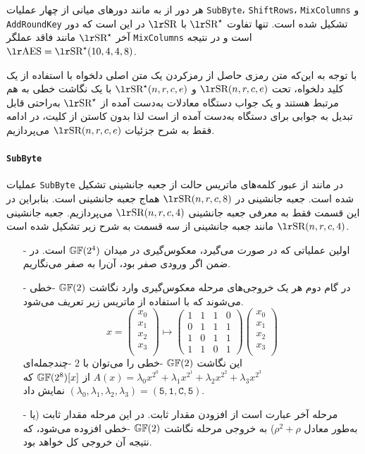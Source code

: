 هر دور از 
به مانند دورهای میانی 
از چهار عملیات 
\texttt{SubByte}، \texttt{ShiftRows}، \texttt{MixColumns}
و 
\texttt{AddRoundKey}
تشکیل شده است. تنها تفاوت 
$\text{\en{SR}}^{\star}$
با 
$\text{\en{SR}}$
در این است که دور آخر 
$\text{\en{SR}}^{\star}$
مانند 
 فاقد عملگر 
\texttt{MixColumns}
است و در نتیجه 
$\text{\en{AES}} = \text{\en{SR}}^{\star}(10,4,4,8)$.

با توجه به این‌که متن رمزی حاصل از رمزکردن یک متن اصلی دلخواه با استفاده از یک کلید دلخواه، تحت 
$\text{\en{SR}}(n,r,c,e)$
و 
$\text{\en{SR}}^{\star}(n,r,c,e)$
با یک نگاشت خطی به هم مرتبط هستند و  یک جواب  دستگاه معادلات  به‌دست آمده از 
$\text{\en{SR}}^{\star}$
به‌راحتی قابل تبدیل به جوابی برای دستگاه به‌دست آمده از 
است لذا بدون کاستن از کلیت، در ادامه فقط به شرح جزئیات 
$\text{\en{SR}}(n,r,c,e)$
می‌پردازیم. 
\paragraph*{\texttt{SubByte}} 
عملیات 
\texttt{SubByte}
در 
مانند 
از عبور کلمه‌های ماتریس حالت از جعبه جانشینی تشکیل شده است. جعبه جانشینی در 
$\text{\en{SR}}(n,r,c,8)$
هماج جعبه جانشینی 
است. بنابراین در این قسمت فقط به معرفی جعبه جانشینی 
$\text{\en{SR}}(n,r,c,4)$
می‌پردازیم. جعبه جانشینی 
$\text{\en{SR}}(n,r,c,4)$
مانند جعبه جانشینی 
از سه قسمت به شرح زیر تشکیل شده است. 
\begin{itemize}
\item[-] 
اولین عملیاتی که در 
صورت می‌گیرد، معکوس‌گیری در میدان 
$\mathbb{GF}(2^{4})$
است. در ضمن اگر ورودی صفر بود، آن‌را به صفر می‌نگاریم. 
\item[-]
در گام دوم هر یک خروجی‌های  مرحله معکوس‌گیری وارد نگاشت 
$\mathbb{GF}(2)$
-خطی می‌شوند که با استفاده از ماتریس زیر تعریف می‌شود. 
$$
x = \begin{pmatrix}
x_{0}\\
x_{1}\\
x_{2}\\
x_{3}\\
\end{pmatrix} \mapsto 
\begin{pmatrix}
1 & 1 & 1 & 0\\
0 & 1 & 1 & 1\\
1 & 0 & 1 & 1\\
1 & 1 & 0 & 1
\end{pmatrix}
\begin{pmatrix}
x_{0}\\
x_{1}\\
x_{2}\\
x_{3}\\
\end{pmatrix}
$$
این نگاشت 
$\mathbb{GF}(2)$
-خطی را می‌توان با 
$2$
-چندجمله‌ای 
$A(x) = \lambda_{0}x^{2^{0}} + \lambda_{1}x^{2^{1}} + \lambda_{2}x^{2^{2}} + \lambda_{3}x^{2^{3}}$
از 
$\mathbb{GF}(2^{8})[x]$
که 
$(\lambda_{0}, \lambda_{1}, \lambda_{2}, \lambda_{3}) = (\texttt{5},\texttt{1},\texttt{C},\texttt{5})$
نمایش داد.
\item[-] 
مرحله آخر 
عبارت‌ است از افزودن مقدار ثابت. در این مرحله مقدار ثابت 
(یا به‌طور معادل 
$\rho^{2} + \rho$)
 به خروجی مرحله نگاشت 
 $\mathbb{GF}(2)$
 -خطی افزوده می‌شود، که نتیجه آن خروجی کل 
خواهد بود. 
\end{itemize}
